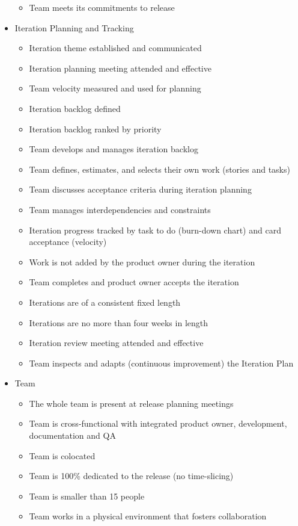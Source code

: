 \begin{appendices}
\begin{itemize}
\begin{itemize}
			\item Team meets its commitments to release
		\end{itemize}
	\item Iteration Planning and Tracking
		\begin{itemize}
			\item Iteration theme established and communicated
			\item Iteration planning meeting attended and effective
			\item Team velocity measured and used for planning
			\item Iteration backlog defined
			\item Iteration backlog ranked by priority
			\item Team develops and manages iteration backlog
			\item Team defines, estimates, and selects their own work (stories and tasks)
			\item Team discusses acceptance criteria during iteration planning
			\item Team manages interdependencies and constraints
			\item Iteration progress tracked by task to do (burn-down chart) and card acceptance (velocity)
			\item Work is not added by the product owner during the iteration
			\item Team completes and product owner accepts the iteration 
			\item Iterations are of a consistent fixed length
			\item Iterations are no more than four weeks in length
			\item Iteration review meeting attended and effective
			\item Team inspects and adapts (continuous improvement) the Iteration Plan
		\end{itemize}
	\item Team
		\begin{itemize}
			\item The whole team is present at release planning meetings
			\item Team is cross-functional with integrated product owner, development, documentation and QA
			\item Team is colocated
			\item Team is 100\% dedicated to the release (no time-slicing)
			\item Team is smaller than 15 people
			\item Team works in a physical environment that fosters collaboration

\end{itemize}
\end{itemize}
\end{appendices}
